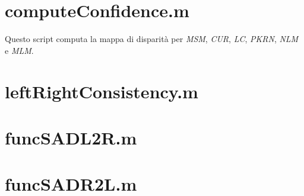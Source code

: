 \documentclass[12pt]{report}
\newcommand{\nullpage}{\newpage\null\thispagestyle{empty}}  %
\begin{document}
		\section{computeConfidence.m}
		\label{sec:computeConfidence}
		
			Questo script computa la mappa di disparità per \textit{MSM}, \textit{CUR}, \textit{LC}, \textit{PKRN}, \textit{NLM} e \textit{MLM}.
	
			
		
		\newpage
		\section{leftRightConsistency.m}
		\label{sec:leftRightConsistency}
				
			
		\newpage
		\section{funcSADL2R.m}
		\label{sec:funcSADL2R}
			
			
		\newpage
		\section{funcSADR2L.m}
		\label{sec:funcSADR2L}
					




	\nullpage
	
\end{document}
